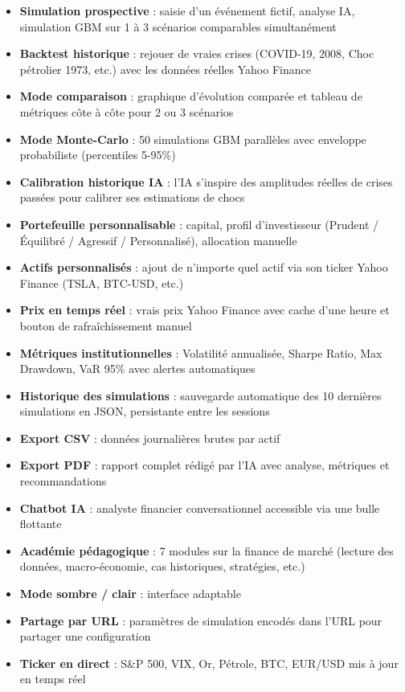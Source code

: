 \documentclass[a4paper, 12pt, twoside]{article}
\begin{document}
\begin{itemize}
    \item[$\checkmark$] \textbf{Simulation prospective} : saisie d'un événement fictif,
    analyse IA, simulation GBM sur 1 à 3 scénarios comparables simultanément
    \item[$\checkmark$] \textbf{Backtest historique} : rejouer de vraies crises
    (COVID-19, 2008, Choc pétrolier 1973, etc.) avec les données réelles Yahoo Finance
    \item[$\checkmark$] \textbf{Mode comparaison} : graphique d'évolution comparée et
    tableau de métriques côte à côte pour 2 ou 3 scénarios
    \item[$\checkmark$] \textbf{Mode Monte-Carlo} : 50 simulations GBM parallèles avec
    enveloppe probabiliste (percentiles 5-95\%)
    \item[$\checkmark$] \textbf{Calibration historique IA} : l'IA s'inspire des
    amplitudes réelles de crises passées pour calibrer ses estimations de chocs
    \item[$\checkmark$] \textbf{Portefeuille personnalisable} : capital, profil
    d'investisseur (Prudent / Équilibré / Agressif / Personnalisé), allocation manuelle
    \item[$\checkmark$] \textbf{Actifs personnalisés} : ajout de n'importe quel actif
    via son ticker Yahoo Finance (TSLA, BTC-USD, etc.)
    \item[$\checkmark$] \textbf{Prix en temps réel} : vrais prix Yahoo Finance avec
    cache d'une heure et bouton de rafraîchissement manuel
    \item[$\checkmark$] \textbf{Métriques institutionnelles} : Volatilité annualisée,
    Sharpe Ratio, Max Drawdown, VaR 95\% avec alertes automatiques
    \item[$\checkmark$] \textbf{Historique des simulations} : sauvegarde automatique
    des 10 dernières simulations en JSON, persistante entre les sessions
    \item[$\checkmark$] \textbf{Export CSV} : données journalières brutes par actif
    \item[$\checkmark$] \textbf{Export PDF} : rapport complet rédigé par l'IA avec
    analyse, métriques et recommandations
    \item[$\checkmark$] \textbf{Chatbot IA} : analyste financier conversationnel
    accessible via une bulle flottante
    \item[$\checkmark$] \textbf{Académie pédagogique} : 7 modules sur la finance de
    marché (lecture des données, macro-économie, cas historiques, stratégies, etc.)
    \item[$\checkmark$] \textbf{Mode sombre / clair} : interface adaptable
    \item[$\checkmark$] \textbf{Partage par URL} : paramètres de simulation encodés
    dans l'URL pour partager une configuration
    \item[$\checkmark$] \textbf{Ticker en direct} : S\&P 500, VIX, Or, Pétrole,
    BTC, EUR/USD mis à jour en temps réel
\end{itemize}
\end{document}
